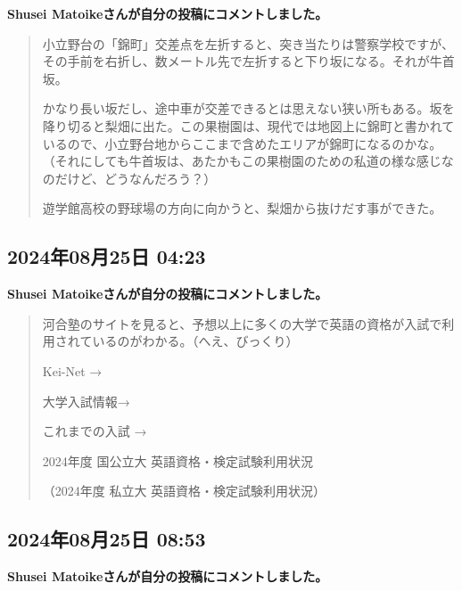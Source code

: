 \textbf{Shusei Matoikeさんが自分の投稿にコメントしました。}

\begin{quote}
小立野台の「錦町」交差点を左折すると、突き当たりは警察学校ですが、その手前を右折し、数メートル先で左折すると下り坂になる。それが牛首坂。

かなり長い坂だし、途中車が交差できるとは思えない狭い所もある。坂を降り切ると梨畑に出た。この果樹園は、現代では地図上に錦町と書かれているので、小立野台地からここまで含めたエリアが錦町になるのかな。（それにしても牛首坂は、あたかもこの果樹園のための私道の様な感じなのだけど、どうなんだろう？）

遊学館高校の野球場の方向に向かうと、梨畑から抜けだす事ができた。
\end{quote}

\subsection*{2024年08月25日 04:23}

\textbf{Shusei Matoikeさんが自分の投稿にコメントしました。}

\begin{quote}
河合塾のサイトを見ると、予想以上に多くの大学で英語の資格が入試で利用されているのがわかる。（へえ、びっくり）

Kei-Net →

大学入試情報→

これまでの入試 →

2024年度 国公立大 英語資格・検定試験利用状況

（2024年度 私立大 英語資格・検定試験利用状況）
\end{quote}

\subsection*{2024年08月25日 08:53}

\textbf{Shusei Matoikeさんが自分の投稿にコメントしました。}

